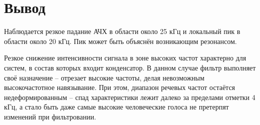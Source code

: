 \chapter{Вывод}

Наблюдается резкое падание АЧХ в области около 25 кГц и локальный пик в области около 20 кГц. Пик может быть объяснён возникающим резонансом.

Резкое снижение интенсивности сигнала в зоне высоких частот характерно для систем, в состав которых входит конденсатор. В данном случае фильтр выполняет своё назначение – отрезает высокие частоты, делая невозможным высокочастотное навязывание. При этом, диапазон речевых частот остаётся недеформированным – спад характеристики лежит далеко за пределами отметки 4 кГц, а стало быть даже самые высокие человеческие голоса не претерпят изменений при фильтровании.

